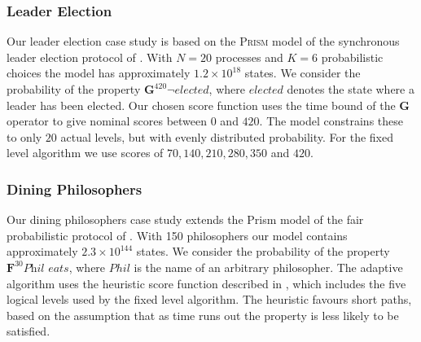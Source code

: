 \documentclass{llncs}
\begin{document}
\subsubsection*{Leader Election}

Our leader election case study is based on the \textsc{Prism} model
of the synchronous leader election protocol of \cite{ItaiRodeh1990}.
With $N=20$ processes and $K=6$ probabilistic choices the model
has approximately $1.2\times10^{18}$ states. We consider the probability
of the property $\mathbf{G}^{420}\neg\mathit{elected}$, where $\mathit{elected}$
denotes the state where a leader has been elected. Our chosen score
function uses the time bound of the $\mathbf{G}$ operator to give
nominal scores between $0$ and $420$. The model constrains these
to only $20$ actual levels, but with evenly distributed probability.
For the fixed level algorithm we use scores of $70,140,210,280,350$
and $420$.


\subsubsection*{Dining Philosophers}

Our dining philosophers case study extends the Prism model of the
fair probabilistic protocol of \cite{LehmannRabin1981}. With 150
philosophers our model contains approximately $2.3\times10^{144}$
states. We consider the probability of the property $\mathbf{F}^{30}\textit{Phil eats}$,
where $\mathit{Phil}$ is the name of an arbitrary philosopher. The
adaptive algorithm uses the heuristic score function described in
\cite{JegourelLegaySedwards2014}, which includes the five logical
levels used by the fixed level algorithm. The heuristic favours short
paths, based on the assumption that as time runs out the property
is less likely to be satisfied.
\end{document}
